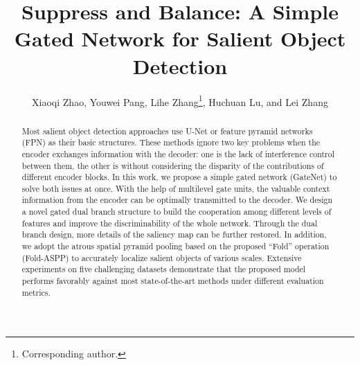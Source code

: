 \documentclass[runningheads]{llncs}
\begin{document}
\pagestyle{headings}
	\mainmatter
	\def\ECCVSubNumber{2852}  

	\title{Suppress and Balance: A Simple Gated Network for Salient Object Detection} 

\begin{comment}
	\titlerunning{ECCV-20 submission ID \ECCVSubNumber} 
	\authorrunning{ECCV-20 submission ID \ECCVSubNumber} 
	\author{Anonymous ECCV submission}
	\institute{Paper ID \ECCVSubNumber}
	\end{comment}


\author{Xiaoqi Zhao\protect\footnotemark[4], Youwei Pang\protect\footnotemark[4], Lihe Zhang\thanks{Corresponding author.}, Huchuan Lu, and Lei Zhang}
\maketitle
	\renewcommand{\thefootnote}{\fnsymbol{footnote}}  \renewcommand{\thefootnote}{\arabic{footnote}}
	\begin{abstract}
		Most salient object detection approaches use U-Net or feature pyramid networks (FPN) as their basic structures. These methods ignore two key problems when the encoder exchanges information with the decoder: one is the lack of interference control between them, the other is without considering the disparity of the contributions of different encoder blocks. In this work, we propose a simple gated network (GateNet) to solve both issues at once. With the help of multilevel gate units, the valuable context information from the encoder can be optimally transmitted to the decoder. We design a novel gated dual branch structure to build the cooperation among different levels of features and improve the discriminability of the whole network. Through the dual branch design, more details of the saliency map can be further restored. In addition, we adopt the atrous spatial pyramid pooling based on the proposed ``Fold'' operation (Fold-ASPP) to accurately localize salient objects of various scales. Extensive experiments on five challenging datasets demonstrate that the proposed model performs favorably against most state-of-the-art methods under different evaluation metrics.
	\end{abstract}
	
\end{document}
